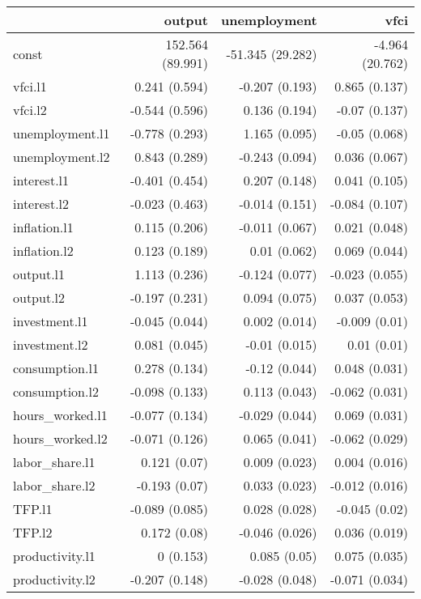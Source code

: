 \begin{longtable}{l|rrr}
\toprule
\multicolumn{1}{l}{} & output & unemployment & vfci \\ 
\midrule\addlinespace[2.5pt]
const & 152.564 (89.991) & -51.345 (29.282) & -4.964 (20.762) \\ 
vfci.l1 & 0.241 (0.594) & -0.207 (0.193) & 0.865 (0.137) \\ 
vfci.l2 & -0.544 (0.596) & 0.136 (0.194) & -0.07 (0.137) \\ 
unemployment.l1 & -0.778 (0.293) & 1.165 (0.095) & -0.05 (0.068) \\ 
unemployment.l2 & 0.843 (0.289) & -0.243 (0.094) & 0.036 (0.067) \\ 
interest.l1 & -0.401 (0.454) & 0.207 (0.148) & 0.041 (0.105) \\ 
interest.l2 & -0.023 (0.463) & -0.014 (0.151) & -0.084 (0.107) \\ 
inflation.l1 & 0.115 (0.206) & -0.011 (0.067) & 0.021 (0.048) \\ 
inflation.l2 & 0.123 (0.189) & 0.01 (0.062) & 0.069 (0.044) \\ 
output.l1 & 1.113 (0.236) & -0.124 (0.077) & -0.023 (0.055) \\ 
output.l2 & -0.197 (0.231) & 0.094 (0.075) & 0.037 (0.053) \\ 
investment.l1 & -0.045 (0.044) & 0.002 (0.014) & -0.009 (0.01) \\ 
investment.l2 & 0.081 (0.045) & -0.01 (0.015) & 0.01 (0.01) \\ 
consumption.l1 & 0.278 (0.134) & -0.12 (0.044) & 0.048 (0.031) \\ 
consumption.l2 & -0.098 (0.133) & 0.113 (0.043) & -0.062 (0.031) \\ 
hours\_worked.l1 & -0.077 (0.134) & -0.029 (0.044) & 0.069 (0.031) \\ 
hours\_worked.l2 & -0.071 (0.126) & 0.065 (0.041) & -0.062 (0.029) \\ 
labor\_share.l1 & 0.121 (0.07) & 0.009 (0.023) & 0.004 (0.016) \\ 
labor\_share.l2 & -0.193 (0.07) & 0.033 (0.023) & -0.012 (0.016) \\ 
TFP.l1 & -0.089 (0.085) & 0.028 (0.028) & -0.045 (0.02) \\ 
TFP.l2 & 0.172 (0.08) & -0.046 (0.026) & 0.036 (0.019) \\ 
productivity.l1 & 0 (0.153) & 0.085 (0.05) & 0.075 (0.035) \\ 
productivity.l2 & -0.207 (0.148) & -0.028 (0.048) & -0.071 (0.034) \\ 
\bottomrule
\end{longtable}
